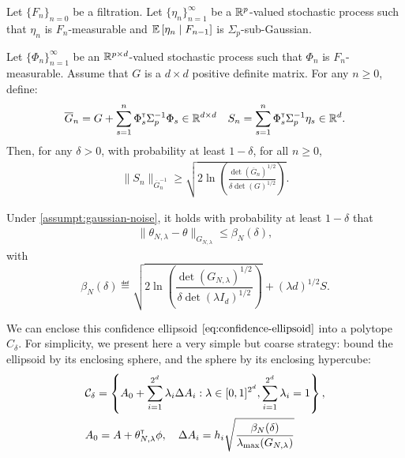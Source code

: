 \documentclass{article}
\begin{document}
\begin{proposition}
\label{prop:concentration}
Let $\{F_n\}_{n=0}$ be a filtration.
Let $\{\eta_n\}_{n=1}^\infty$ be a $\mathbb{R}^p$-valued stochastic process such that $\eta_n$ is $F_n$-measurable and $\operatorname*{\mathbb{E}}\left[\eta_n\;\middle|\; F_{n-1}\right]$ is $\Sigma_p$-sub-Gaussian.

Let $\{\Phi_n\}_{n=1}^\infty$ be an $\mathbb{R}^{p\times d}$-valued stochastic process such that $\Phi_n$ is $F_n$-measurable. Assume that $G$ is a $d\times d$ positive definite matrix. For any $n\geq 0$, define:
\begin{equation*}
    \overline{G}_n = G + \sum_{s=1}^n \Phi_s^{\mathsf{\scriptscriptstyle T}} \Sigma_p^{-1} \Phi_s \in \mathbb{R}^{d\times d} \quad S_n = \sum_{s=1}^n \Phi_s^{\mathsf{\scriptscriptstyle T}}\Sigma_p^{-1}\eta_s \in \mathbb{R}^{d}.
\end{equation*}
Then, for any $\delta>0$, with probability at least $1-\delta$, for all $n\geq0$,
\begin{align*}
\| S_n \|_{\overline{G}_n^{-1}} \geq \sqrt{2\ln \left(\frac{\det\left(\overline{G}_n\right)^{1/2}}{\delta\det(G)^{1/2}}\right)}.
\end{align*}
\end{proposition}

\begin{theorem}
\label{thm:confidence_ellipsoid}
Under \autoref{assumpt:gaussian-noise}, it holds with probability at least $1-\delta$ that
\begin{align}
    \label{eq:confidence-ellipsoid}
    \| \theta_{N,\lambda}  - \theta\|_{G_{N,\lambda}} \leq \beta_N(\delta),
\end{align}
with
\begin{equation}
    \beta_N(\delta)\eqdef \sqrt{2\ln \left(\frac{\det(G_{N,\lambda})^{1/2}}{\delta\det(\lambda I_d)^{1/2}}\right)}
     + (\lambda d)^{1/2}S.
\end{equation}
\end{theorem}

We can enclose this confidence ellipsoid $\eqref{eq:confidence-ellipsoid}$ into a polytope $C_\delta$. For simplicity, we present here a very simple but coarse strategy: bound the ellipsoid by its enclosing sphere, and the sphere by its enclosing hypercube:
\begin{align}
    \label{eq:generic-polytope}
     &\mathcal{C}_\delta = \left\{ A_{0}+\sum_{i=1}^{2^d}\lambda_{i}\Delta A_{i}: \lambda\in[0, 1]^{2^d},  \sum_{i=1}^{2^d}\lambda_{i}=1\right\},\\
     &A_0 = A + \theta_{N,\lambda}^{\mathsf{\scriptscriptstyle T}}\phi, \quad\Delta A_{i} = h_i \sqrt{\frac{\beta_N(\delta)}{\lambda_{\max}(G_{N,\lambda})}}
\end{align}
\end{document}
